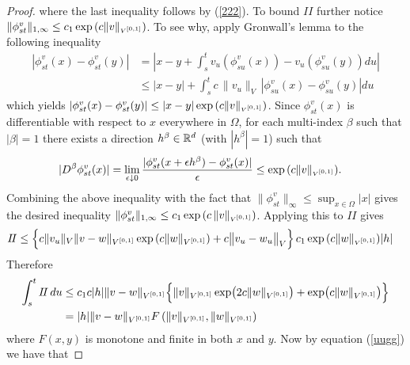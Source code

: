 \documentclass[noinfoline]{imsart}
\begin{document}
\begin{proof}
{} \fi
where the last inequality follows by (\ref{222}). To bound $I\!I$ further notice $
  \|\phi_{st}^v\|_{1,\infty} \leq c_1\exp{\left( c\| v \|_\text{\tiny $V^{[0,1]}$} \right)}$. To see why,
apply Gronwall's lemma to the following inequality
\begin{align*}
|\phi_{st}^v(x) - \phi_{st}^v(y)| &= \left| x-y + \int_{s}^t v_u (\phi_{su}^v(x)) -  v_u (\phi_{su}^v(y)) du\right|\\
& \leq  |x-y| + \int_{s}^t c\, \|v_u\|_{V^{\phantom{[}}} |\phi_{su}^v(x) -  \phi_{su}^v(y)| du
\end{align*}
which yields $| \phi_{st}^v(x) - \phi_{st}^v(y) |\leq |x-y| \exp{\left( c\| v \|_\text{\tiny $V^{[0,1]}$} \right)}$.
  Since $\phi_{st}^v(x)$ is differentiable with respect to $x$ everywhere in $\Omega$, for each multi-index $\beta$ such that $|\beta|=1$ there exists a direction $h^\beta\in \Bbb R^d$ (with $|h^\beta|=1$) such that
 \begin{align*}
 |D^\beta \phi_{st}^v(x) | &= \lim _{\epsilon \downarrow 0} \frac{|\phi_{st}^v(x+\epsilon h^\beta) - \phi_{st}^v(x)|}{\epsilon}  \leq  \exp{\left( c\| v \|_\text{\tiny $V^{[0,1]}$} \right)}.
 \end{align*}
 Combining the above inequality with the fact that $ \|\phi_{st}^v\|_\infty \leq \sup_{x\in \Omega} |x| $ gives  the desired inequality
 $ \|\phi_{st}^v\|_{1,\infty} \leq c_1\exp{\left( c\,\| v \|_\text{\tiny $V^{[0,1]}$} \right)}$. Applying this to $ I\!I $ gives
 \begin{align*}
 I\!I &\leq \Bigl\{  c \| v_u \|_{V}  \|v-w\|_{V^{[0,1]}} \exp\left(c \| w \|_{V^{[0,1]}} \right)   + c \bigl\| v_u-w_u\bigr \|_{V} \Bigr\}\, c_1\exp{\left( c \| w \|_\text{\tiny $V^{[0,1]}$} \right)} |h|
 \end{align*}
 Therefore
 \begin{align*}
\int_s^t I\!I\, du
&\leq c_1 c |h| \|v-w \|_{V^{[0,1]}}\Bigl\{\|v\|_{V^{[0,1]}} \exp\bigl( 2c\| w \|_{V^{[0,1]}} \bigr)  +  \exp\bigl( c\| w \|_{V^{[0,1]}} \bigr)  \Bigr\}\\
& =  |h|  \|v-w\|_{V^{[0,1]}}  F\left(\|v \|_{V^{[0,1]}} ,\| w\|_{V^{[0,1]}}\right)
\end{align*}
where $F(x,y)$ is monotone and finite in both $x$ and $y$. Now by equation (\ref{uugg}) we have that

\end{proof}
\end{document}
